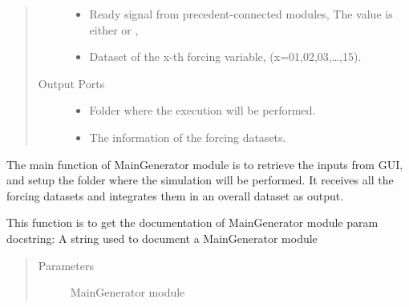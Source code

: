 \documentclass[letterpaper,10pt,english]{sphinxmanual}
\begin{document}
\begin{fulllineitems}
\begin{quote}
\begin{description}
\begin{itemize}
\item {} 
 Ready signal from precedent-connected modules, The value is either  or ,

\item {} 
 Dataset of the x-th forcing variable, (x=01,02,03,…,15).

\end{itemize}

\item[{Output Ports}] \leavevmode\begin{itemize}
\item {} 
 Folder where the execution will be performed.

\item {} 
 The information of the forcing datasets.

\end{itemize}

\end{description}\end{quote}

\begin{fulllineitems}
\label{\detokenize{AgentTools.GenericModelAgent:AgentTools.GenericModelAgent.MainGenerator.MainGenerator.compute}}
The main function of MainGenerator module is to retrieve the inputs from GUI,         and  setup the folder where the simulation will be performed.        It receives all the forcing datasets and integrates them in an overall dataset as output.

\end{fulllineitems}


\begin{fulllineitems}
\label{\detokenize{AgentTools.GenericModelAgent:AgentTools.GenericModelAgent.MainGenerator.MainGenerator.get_documentation}}
This function is to get the documentation of MainGenerator module
param docstring: A string used to document a MainGenerator module
\begin{quote}\begin{description}
\item[{Parameters}] \leavevmode
{} \textendash{} MainGenerator module


\end{description}
\end{quote}
\end{fulllineitems}
\end{fulllineitems}
\end{document}
